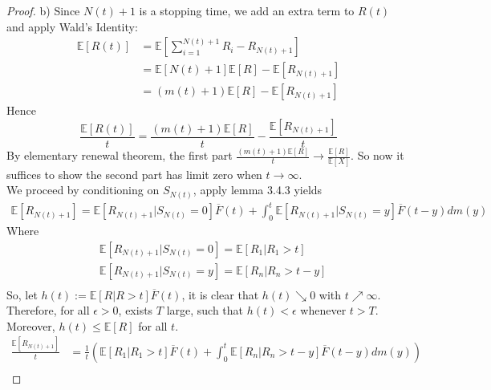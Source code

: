 \documentclass[a4paper, 10pt]{article}
\theoremstyle{definition}
\theoremstyle{hSol}
\begin{document}
\begin{proof} b) Since $N(t)+1$ is a stopping time, we add an extra term to $R(t)$ and apply Wald's Identity:
\begin{equation}
  \begin{split}
    \mathbb{E}\left[R(t)\right] &= \mathbb{E}\left[\sum_{i=1}^{N(t)+1}R_i-R_{N(t)+1}\right]  \\
    &= \mathbb{E}\left[N(t)+1\right]\mathbb{E}\left[R\right] - \mathbb{E}\left[R_{N(t)+1}\right] \\
    &= (m(t)+1)\mathbb{E}\left[R\right] - \mathbb{E}\left[R_{N(t)+1}\right]
  \end{split}
\end{equation}
Hence
\begin{equation}
  \frac{\mathbb{E}\left[R(t)\right]}{t} = \frac{(m(t)+1)\mathbb{E}\left[R\right]}{t} - \frac{\mathbb{E}\left[R_{N(t)+1}\right]}{t}
\end{equation}
By elementary renewal theorem, the first part $\frac{(m(t)+1)\mathbb{E}\left[R\right]}{t} \to \frac{\mathbb{E}\left[R\right]}{\mathbb{E}\left[X\right]}$. So now it suffices to show the second part has limit zero when $t\to \infty$. \\
We proceed by conditioning on $S_{N(t)}$, apply lemma 3.4.3 yields
\begin{equation}
  \begin{split}
    \mathbb{E}\left[R_{N(t)+1}\right] = \mathbb{E}\left[R_{N(t)+1}|S_{N(t)}=0\right]\overline{F}(t) + \int_0^t \mathbb{E}\left[R_{N(t)+1}|S_{N(t)}=y\right]\overline{F}(t-y)dm(y)
  \end{split}
\end{equation}
Where
\begin{equation}
  \begin{split}
    & \mathbb{E}\left[R_{N(t)+1}|S_{N(t)}=0\right] = \mathbb{E}\left[R_1|R_1>t\right]\\
    & \mathbb{E}\left[R_{N(t)+1}|S_{N(t)}=y\right] = \mathbb{E}\left[R_n|R_n>t-y\right]\\
  \end{split}
\end{equation}
So, let $h(t):=\mathbb{E}\left[R|R>t\right]\overline{F}(t)$, it is clear that $h(t)\searrow 0$ with $t\nearrow\infty$. Therefore, for all $\epsilon>0$, exists $T$ large, such that $h(t)< \epsilon$ whenever $t>T$. Moreover, $h(t)\leq \mathbb{E}\left[R\right]$ for all $t$.
\begin{equation}
  \begin{split}
    \frac{\mathbb{E}\left[R_{N(t)+1}\right]}{t} &= \frac{1}{t}\left(\mathbb{E}\left[R_1|R_1>t\right]\overline{F}(t) + \int_0^t \mathbb{E}\left[R_n|R_n>t-y\right]\overline{F}(t-y)dm(y)\right)\\

\end{split}
\end{equation}
\end{proof}
\end{document}

